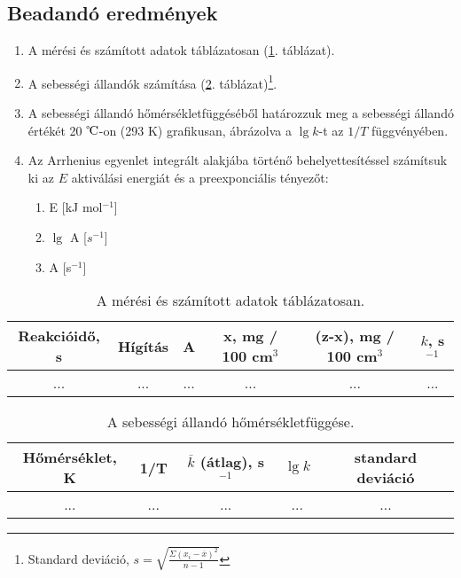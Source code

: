 \documentclass[a4paper, 12pt, twoside]{article}
\begin{document}
\subsection{Beadandó eredmények}

\begin{enumerate}
\item A mérési és számított adatok táblázatosan (\ref{table:tablazatos}. táblázat).
\item A sebességi állandók számítása (\ref{table:seb}. táblázat)\footnote{Standard deviáció, $s=\sqrt{\frac{\Sigma(x_i-\overline{x})^2}{n-1}}$}.
\item A sebességi állandó hőmérsékletfüggéséből határozzuk meg a sebességi állandó értékét 20 $\celsius$-on (293 K) grafikusan, ábrázolva a $\lg k$-t az $1/T$ függvényében.
\item Az Arrhenius egyenlet integrált alakjába történő behelyettesítéssel számítsuk ki az $E$ aktiválási energiát és a preexponciális tényezőt:
	\begin{enumerate}
		\item E [kJ mol$^{-1}$]
		\item $\lg$ A [$s^{-1}$]
		\item A [s$^{-1}$]
	\end{enumerate}
\end{enumerate}

\begin{table}[!h]
\caption{A mérési és számított adatok táblázatosan.}
\centering
\begin{tabular}{|c|c|c|c|c|c|}
\hline
Reakcióidő, s&Hígítás&A&x, mg / 100 cm$^3$ &(z-x), mg / 100 cm$^3$ & $k$, s$^{-1}$ \\
\hline
... & ... & ... & ... & ... & ... \\
\end{tabular}
\label{table:tablazatos}
\end{table}

\begin{table}[!h]
\caption{A sebességi állandó hőmérsékletfüggése.}
\centering
\begin{tabular}{|c|c|c|c|c|}
\hline
Hőmérséklet, K& 1/T & $\overline{k}$ (átlag), s$^{-1}$ & $\lg k$ & standard deviáció \\
\hline
... & ... & ... & ... & ... \\
\end{tabular}
\label{table:seb}
\end{table}
\end{document}
